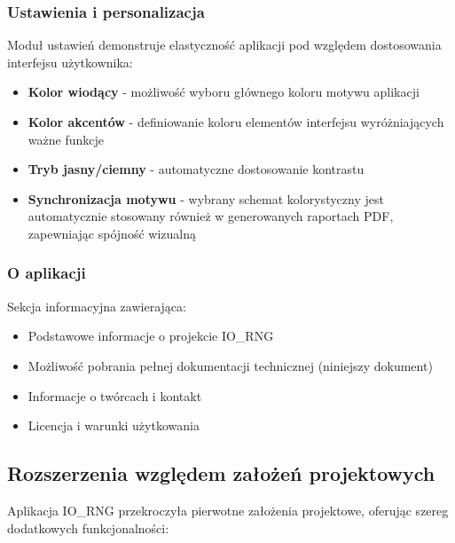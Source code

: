\documentclass[12pt,a4paper]{article}
\begin{document}
\subsubsection{Ustawienia i personalizacja}

Moduł ustawień demonstruje elastyczność aplikacji pod względem dostosowania interfejsu użytkownika:

\begin{itemize}
    \item \textbf{Kolor wiodący} - możliwość wyboru głównego koloru motywu aplikacji
    \item \textbf{Kolor akcentów} - definiowanie koloru elementów interfejsu wyróżniających ważne funkcje
    \item \textbf{Tryb jasny/ciemny} - automatyczne dostosowanie kontrastu
    \item \textbf{Synchronizacja motywu} - wybrany schemat kolorystyczny jest automatycznie stosowany również w generowanych raportach PDF, zapewniając spójność wizualną
\end{itemize}

\subsubsection{O aplikacji}

Sekcja informacyjna zawierająca:
\begin{itemize}
    \item Podstawowe informacje o projekcie IO\_RNG
    \item Możliwość pobrania pełnej dokumentacji technicznej (niniejszy dokument)
    \item Informacje o twórcach i kontakt
    \item Licencja i warunki użytkowania
\end{itemize}

\subsection{Rozszerzenia względem założeń projektowych}

Aplikacja IO\_RNG przekroczyła pierwotne założenia projektowe, oferując szereg dodatkowych funkcjonalności:
\end{document}
